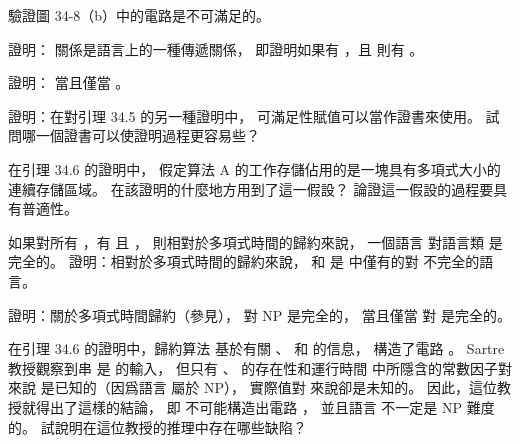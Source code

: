 \startsection[
  title={NP-completeness and reducibility},
]

\startEXERCISE
驗證圖 34-8（b）中的電路是不可滿足的。
\stopEXERCISE

\startANSWER
{}
\stopANSWER

\startEXERCISE
證明：  關係是語言上的一種傳遞關係，
即證明如果有 ，且  則有 。
\stopEXERCISE

\startANSWER
{}
\stopANSWER

\startEXERCISE
證明：  當且僅當 。
\stopEXERCISE

\startANSWER
{}
\stopANSWER

\startEXERCISE
證明：在對引理 34.5 的另一種證明中，
可滿足性賦值可以當作證書來使用。
試問哪一個證書可以使證明過程更容易些？
\stopEXERCISE

\startANSWER
{}
\stopANSWER

\startEXERCISE
在引理 34.6 的證明中，
假定算法 A 的工作存儲佔用的是一塊具有多項式大小的連續存儲區域。
在該證明的什麼地方用到了這一假設？
論證這一假設的過程要具有普適性。
\stopEXERCISE

\startANSWER
{}
\stopANSWER

\startEXERCISE[exercise:34.3-6]
如果對所有 ，有  且 ，
則相對於多項式時間的歸約來說，
一個語言  對語言類  是{\EMP 完全的}。
證明：相對於多項式時間的歸約來說，
 \m{\phi} 和  是  中僅有的對  不完全的語言。
\stopEXERCISE

\startANSWER
{}
\stopANSWER

\startEXERCISE[exercise:34.3-7]
證明：關於多項式時間歸約（參見\inexercise[34.3-6]），
  對 NP 是完全的，
當且僅當  對  是完全的。
\stopEXERCISE

\startANSWER
{}
\stopANSWER

\startEXERCISE
在引理 34.6 的證明中，歸約算法  基於有關 、  和  的信息，
構造了電路 。
 Sartre 教授觀察到串  是  的輸入，
但只有 、  的存在性和運行時間  中所隱含的常數因子對  來說
是已知的（因爲語言  屬於 NP），
實際值對  來說卻是未知的。
因此，這位教授就得出了這樣的結論，
即  不可能構造出電路 ，
並且語言  不一定是 NP 難度的。
試說明在這位教授的推理中存在哪些缺陷？
\stopEXERCISE

\startANSWER
{}
\stopANSWER

\stopsection
